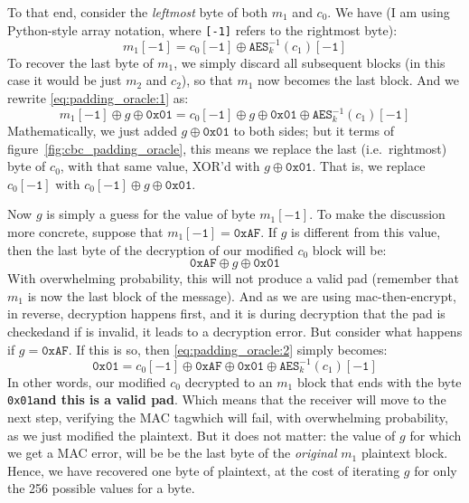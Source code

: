   To that end, consider the \emph{leftmost} byte of both $m_1$ and $c_0$. We have (I am using Python-style array notation, where \texttt{[-1]} refers to the rightmost byte):
  \begin{equation}
    \label{eq:padding_oracle:1}
    m_1\mathtt{[-1]} = c_0\mathtt{[-1]} \oplus \texttt{AES}_k^{-1}(c_1)\mathtt{[-1]}
  \end{equation}
  To recover the last byte of $m_1$, we simply discard all subsequent blocks (in this case it would be just $m_2$ and $c_2$), so that $m_1$ now becomes the last block. And we rewrite \eqref{eq:padding_oracle:1} as:
  \begin{equation}
    \label{eq:padding_oracle:2}
    m_1\mathtt{[-1]} \oplus g \oplus \texttt{0x01} = c_0\mathtt{[-1]} \oplus g \oplus \texttt{0x01} \oplus \texttt{AES}_k^{-1}(c_1)\mathtt{[-1]}
  \end{equation}
  Mathematically, we just added $g \oplus \texttt{0x01}$ to both sides; but it terms of figure~\ref{fig:cbc_padding_oracle}, this means we replace the last (i.e.\ rightmost) byte of $c_0$, with that same value, XOR'd with $g \oplus \texttt{0x01}$. That is, we replace $c_0\mathtt{[-1]}$ with $c_0\mathtt{[-1]} \oplus g \oplus \texttt{0x01}$.

  Now $g$ is simply a guess for the value of byte $m_1\mathtt{[-1]}$. To make the discussion more concrete, suppose that $m_1\mathtt{[-1]} = \mathtt{0xAF}$. If $g$ is different from this value, then the last byte of the decryption of our modified $c_0$ block will be:
  \begin{equation}
    \label{eq:padding_oracle:3}
    \mathtt{0xAF} \oplus g \oplus \texttt{0x01}
  \end{equation}
  With overwhelming probability, this will not produce a valid pad (remember that $m_1$ is now the last block of the message). And as we are using mac-then-encrypt, in reverse, decryption happens first, and it is during decryption that the pad is checked\emd and if is invalid, it leads to a decryption error. But consider what happens if $g = \mathtt{0xAF}$. If this is so, then \eqref{eq:padding_oracle:2} simply becomes:
  \begin{equation}
    \label{eq:padding_oracle:4}
    \texttt{0x01} = c_0\mathtt{[-1]} \oplus \mathtt{0xAF} \oplus \texttt{0x01} \oplus \texttt{AES}_k^{-1}(c_1)\mathtt{[-1]}
  \end{equation}
  In other words, our modified $c_0$ decrypted to an $m_1$ block that ends with the byte \texttt{0x01}\emd \textbf{and this is a valid pad}. Which means that the receiver will move to the next step, verifying the MAC tag\emd which will fail, with overwhelming probability, as we just modified the plaintext. But it does not matter: the value of $g$ for which we get a MAC error, will be be the last byte of the \emph{original} $m_1$ plaintext block. Hence, we have recovered one byte of plaintext, at the cost of iterating $g$ for only the 256 possible values for a byte.

